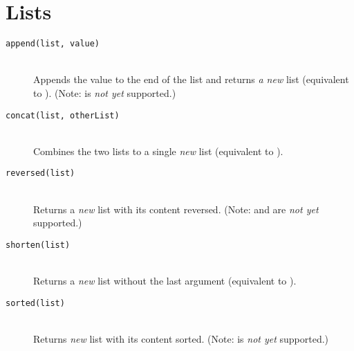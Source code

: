 \section{Lists}
\begin{description}
\item[\texttt{append(list, value)}] \hfill \\
	Appends the value to the end of the list and returns \emph{a new} list (equivalent to ).
(Note:  is \emph{not yet} supported.)
\item[\texttt{concat(list, otherList)}] \hfill \\
	Combines the two lists to a single \emph{new} list (equivalent to ).
\item[\texttt{reversed(list)}] \hfill \\
	Returns a \emph{new} list with its content reversed.
(Note:  and  are \emph{not yet} supported.)
\item[\texttt{shorten(list)}] \hfill \\
	Returns a \emph{new} list without the last argument (equivalent to ).
\item[\texttt{sorted(list)}] \hfill \\
	Returns \emph{new} list with its content sorted.
(Note:  is \emph{not yet} supported.)
\end{description}

